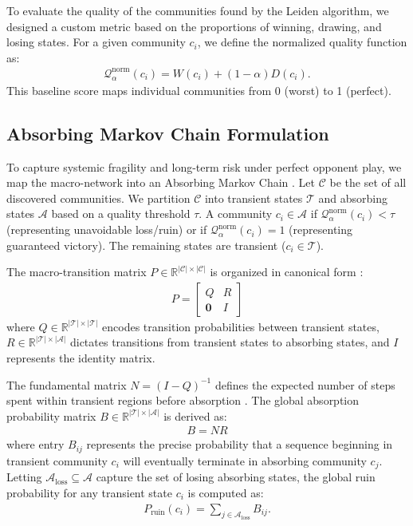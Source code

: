 \documentclass[9pt,twocolumn,twoside]{pnas-report}
\begin{document}
To evaluate the quality of the communities found by the Leiden algorithm, we designed a custom metric based on the proportions of winning, drawing, and losing states. For a given community $c_i$, we define the normalized quality function as:
\begin{align}
    \mathcal{Q}_\alpha^{\text{norm}}(c_i) = W(c_i) + (1 - \alpha)D(c_i).
    \label{Q_norm}
\end{align}
This baseline score maps individual communities from 0 (worst) to 1 (perfect).

\subsection*{Absorbing Markov Chain Formulation}
To capture systemic fragility and long-term risk under perfect opponent play, we map the macro-network into an Absorbing Markov Chain \cite{markov_chains}. Let $\mathcal{C}$ be the set of all discovered communities. We partition $\mathcal{C}$ into transient states $\mathcal{T}$ and absorbing states $\mathcal{A}$ based on a quality threshold $\tau$. A community $c_i \in \mathcal{A}$ if $\mathcal{Q}_\alpha^{\text{norm}}(c_i) < \tau$ (representing unavoidable loss/ruin) or if $\mathcal{Q}_\alpha^{\text{norm}}(c_i) = 1$ (representing guaranteed victory). The remaining states are transient ($c_i \in \mathcal{T}$).

The macro-transition matrix $P \in \mathbb{R}^{|\mathcal{C}| \times |\mathcal{C}|}$ is organized in canonical form \cite{markov_chains}:
\begin{align}
    P = \begin{bmatrix} Q & R \\ \mathbf{0} & I \end{bmatrix}
    \label{P_matrix}
\end{align}
where $Q \in \mathbb{R}^{|\mathcal{T}| \times |\mathcal{T}|}$ encodes transition probabilities between transient states, $R \in \mathbb{R}^{|\mathcal{T}| \times |\mathcal{A}|}$ dictates transitions from transient states to absorbing states, and $I$ represents the identity matrix.

The fundamental matrix $N = (I - Q)^{-1}$ defines the expected number of steps spent within transient regions before absorption \cite{markov_chains}. The global absorption probability matrix $B \in \mathbb{R}^{|\mathcal{T}| \times |\mathcal{A}|}$ is derived as:
\begin{align}
    B = N R
    \label{B_matrix}
\end{align}
where entry $B_{ij}$ represents the precise probability that a sequence beginning in transient community $c_i$ will eventually terminate in absorbing community $c_j$. Letting $\mathcal{A}_{\text{loss}} \subseteq \mathcal{A}$ capture the set of losing absorbing states, the global ruin probability for any transient state $c_i$ is computed as:
\begin{align}
    P_{\text{ruin}}(c_i) = \sum_{j \in \mathcal{A}_{\text{loss}}} B_{ij}.
    \label{P_ruin}
\end{align}
\end{document}
